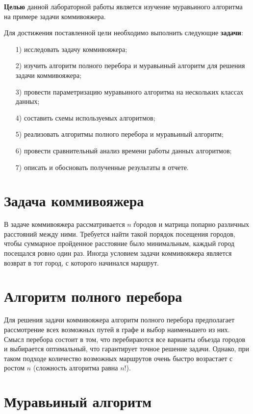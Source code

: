 \documentclass[a4paper,14pt, unknownkeysallowed]{extreport}
\begin{document}
\textbf{Целью} данной лабораторной работы является изучение муравьиного алгоритма на примере задачи коммивояжера.

Для достижения поставленной цели необходимо выполнить следующие \textbf{задачи}:

\begin{enumerate}
	\item[1)] исследовать задачу коммивояжера;
	\item[2)] изучить алгоритм полного перебора и муравьиный алгоритм для решения задачи коммивояжера;
	\item[3)] провести параметризацию муравьиного алгоритма на нескольких классах данных;
	\item[4)] составить схемы используемых алгоритмов;
	\item[5)] реализовать алгоритмы полного перебора и муравьиный алгоритм;
	\item[6)] провести сравнительный анализ времени работы данных алгоритмов;
	\item[7)] описать и обосновать полученные результаты в отчете.
\end{enumerate}

\section{Задача коммивояжера}

В задаче коммивояжера рассматривается $n$ ݊городов и матрица попарно различных расстояний между ними.
Требуется найти такой порядок посещения городов, чтобы суммарное пройденное расстояние было минимальным, каждый город посещался ровно один раз.
Иногда условием задачи коммивояжера является возврат в тот город, с которого начинался маршрут.

\section{Алгоритм полного перебора}

Для решения задачи коммивояжера алгоритм полного перебора предполагает рассмотрение всех возможных путей в графе и выбор наименьшего из них. 
Смысл перебора состоит в том, что перебираются все варианты объезда городов и выбирается оптимальный, что гарантирует точное решение задачи.
Однако, при таком подходе количество возможных маршрутов очень быстро возрастает с ростом $n$ (сложность алгоритма равна $n!$).

\section{Муравьиный алгоритм}
\end{document}
